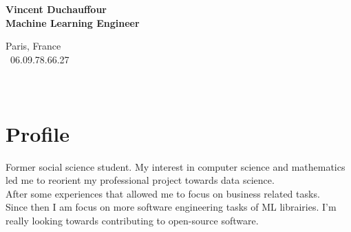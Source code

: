 \documentclass[a4paper,10pt]{article}
\begin{document}
\thispagestyle{empty}


\begin{adjustbox}{valign=t}
    \begin{minipage}{0.3\textwidth}
        \begin{center}
            {\Large \bfseries Vincent Duchauffour}\\
            {\large \bfseries Machine Learning Engineer}\\[1cm]
            \raggedright
            Paris, France\\
            \phone~06.09.78.66.27\\
            \textcolor{ColorTwo}{\faEnvelopeO}
             \\
            \textcolor{ColorTwo}{\faChain}
            \\
            \textcolor{ColorTwo}{\faChain}
        \end{center}
        \vspace{-.5cm}
        \section*{Profile}
        \justifying Former social science student. My interest in computer science and mathematics led me to reorient my professional project towards data science.\\
        After some experiences that allowed me to focus on business related tasks.\\
        Since then I am focus on more software engineering tasks of ML librairies. I'm really looking towards contributing to open-source software. 

\end{minipage}
\end{adjustbox}
\end{document}
